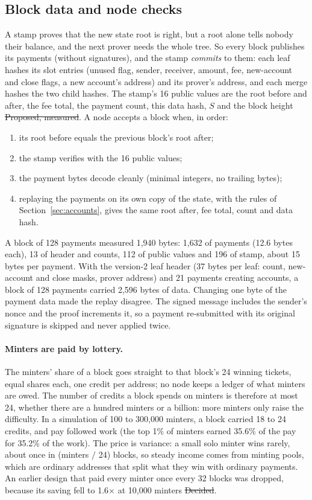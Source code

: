 \subsection{Block data and node checks}\label{sec:blockdata}
A stamp proves that the new state root is right, but a root alone tells nobody their balance, and the next prover needs the whole tree. So every block publishes its payments (without signatures), and the stamp \emph{commits} to them: each leaf hashes its slot entries (unused flag, sender, receiver, amount, fee, new-account and close flags, a new account's address) and its prover's address, and each merge hashes the two child hashes. The stamp's 16 public values are the root before and after, the fee total, the payment count, this data hash, $S$ and the block height \st{Proposed, measured}. A node accepts a block when, in order:
\begin{enumerate}
\item its root before equals the previous block's root after;
\item the stamp verifies with the 16 public values;
\item the payment bytes decode cleanly (minimal integers, no trailing bytes);
\item replaying the payments on its own copy of the state, with the rules of Section~\ref{sec:accounts}, gives the same root after, fee total, count and data hash.
\end{enumerate}
A block of 128 payments measured 1,940 bytes: 1,632 of payments (12.6 bytes each), 13 of header and counts, 112 of public values and 196 of stamp, about 15 bytes per payment. With the version-2 leaf header (37 bytes per leaf: count, new-account and close masks, prover address) and 21 payments creating accounts, a block of 128 payments carried 2,596 bytes of data. Changing one byte of the payment data made the replay disagree. The signed message includes the sender's nonce and the proof increments it, so a payment re-submitted with its original signature is skipped and never applied twice.

\paragraph{Minters are paid by lottery.} The minters' share of a block goes straight to that block's 24 winning tickets, equal shares each, one credit per address; no node keeps a ledger of what minters are owed. The number of credits a block spends on minters is therefore at most 24, whether there are a hundred minters or a billion: more minters only raise the difficulty. In a simulation of 100 to 300,000 minters, a block carried 18 to 24 credits, and pay followed work (the top 1\% of minters earned 35.6\% of the pay for 35.2\% of the work). The price is variance: a small solo minter wins rarely, about once in (minters $/$ 24) blocks, so steady income comes from minting pools, which are ordinary addresses that split what they win with ordinary payments. An earlier design that paid every minter once every 32 blocks was dropped, because its saving fell to 1.6$\times$ at 10,000 minters \st{Decided}.


